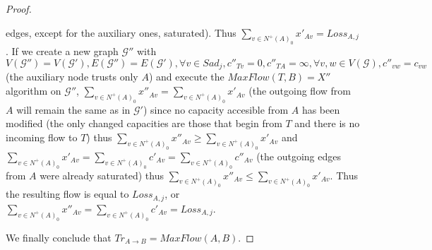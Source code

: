 \documentclass[11pt]{article}
\theoremstyle{definition}
\theoremstyle{corollary}
\theoremstyle{lemma}
\begin{document}
\begin{proof}
\begin{itemize}
          edges, except for the auxiliary ones, saturated). Thus $\sum\limits_{v \in N^{+}(A)_0}x'_{Av} = Loss_{A, j}$.
          If we create a new graph $\mathcal{G}''$ with $V(\mathcal{G}'') = V(\mathcal{G}'), E(\mathcal{G}'') =
          E(\mathcal{G}'), \forall v \in Sad_j, c''_{Tv} = 0, c''_{TA} = \infty, \forall v,w \in V(\mathcal{G}), c''_{vw} =
          c_{vw}$ (the auxiliary node trusts only $A$) and execute the $MaxFlow(T, B) = X''$ algorithm on $\mathcal{G}''$,
          $\sum\limits_{v \in N^{+}(A)_0}x''_{Av} = \sum\limits_{v \in N^{+}(A)_0}x'_{Av}$ (the outgoing flow from
          $A$ will remain the same as in $\mathcal{G}'$) since no capacity accesible from $A$ has been modified (the only
          changed capacities are those that begin from $T$ and there is no incoming flow to $T$) thus $\sum\limits_{v \in
          N^{+}(A)_0}x''_{Av} \geq \sum\limits_{v \in N^{+}(A)_0}x'_{Av}$ and $\sum\limits_{v \in N^{+}(A)_0}x'_{Av} =
          \sum\limits_{v \in N^{+}(A)_0}c'_{Av} = \sum\limits_{v \in N^{+}(A)_0}c''_{Av}$ (the outgoing edges from $A$ were
          already saturated) thus $\sum\limits_{v \in N^{+}(A)_0}x''_{Av} \leq \sum\limits_{v \in N^{+}(A)_0}x'_{Av}$. Thus
          the resulting flow is equal to $Loss_{A, j}$, or $\sum\limits_{v \in N^{+}(A)_0}x''_{Av} = \sum\limits_{v \in
          N^{+}(A)_0}c'_{Av} = Loss_{A, j}$.
       \end{itemize}
       We finally conclude that $Tr_{A \rightarrow B} = MaxFlow(A, B)$.
    \end{proof}
\end{document}
